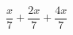 \begin{ex}
	\begin{condition}
		\( \dfrac{x}{7}+\dfrac{2x}{7}+\dfrac{4x}{7} \)
	\end{condition}
\end{ex}